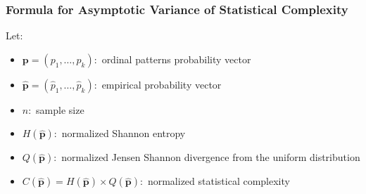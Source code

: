 \subsubsection{Formula for Asymptotic Variance of Statistical Complexity}
Let:
\begin{itemize}
	\item $\mathbf{p} = (p_1,\dots, p_k):$ ordinal patterns probability vector
	\item $\widehat{\mathbf{p}} = (\widehat{p}_1,\dots, \widehat{p}_k):$ empirical probability vector
	\item $n:$ sample size
	\item $H(\widehat{\mathbf{p}}):$ normalized Shannon entropy
	\item $Q(\widehat{\mathbf{p}}):$ normalized Jensen Shannon divergence from the uniform distribution
	\item $C(\widehat{\mathbf{p}})=H(\widehat{\mathbf{p}}) \times Q(\widehat{\mathbf{p}}):$ normalized statistical complexity
\end{itemize}

